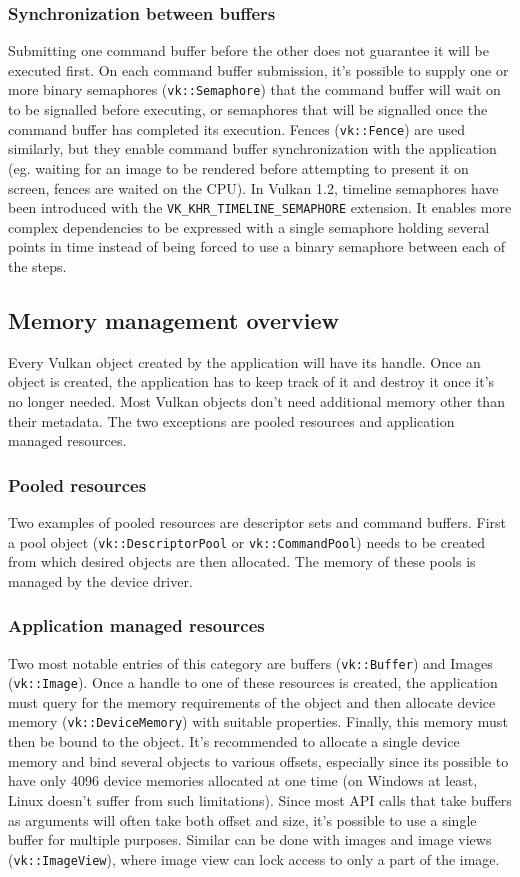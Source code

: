 \documentclass[times, utf8, zavrsni, numeric]{fer}
\begin{document}
\subsubsection{Synchronization between buffers}
Submitting one command buffer before the other does not guarantee it will be executed first. On each command buffer submission, it's possible to supply one or more binary semaphores (\texttt{vk::Semaphore}) that the command buffer will wait on to be signalled before executing, or semaphores that will be signalled once the command buffer has completed its execution. Fences (\texttt{vk::Fence}) are used similarly, but they enable command buffer synchronization with the application (eg. waiting for an image to be rendered before attempting to present it on screen, fences are waited on the CPU). In Vulkan 1.2, timeline semaphores have been introduced with the \texttt{VK\_KHR\_TIMELINE\_SEMAPHORE} extension. It enables more complex dependencies to be expressed with a single semaphore holding several points in time instead of being forced to use a binary semaphore between each of the steps.

\subsection{Memory management overview}
Every Vulkan object created by the application will have its handle. Once an object is created, the application has to keep track of it and destroy it once it's no longer needed. Most Vulkan objects don't need additional memory other than their metadata. The two exceptions are pooled resources and application managed resources.

\subsubsection{Pooled resources}
Two examples of pooled resources are descriptor sets and command buffers. First a pool object (\texttt{vk::DescriptorPool} or \texttt{vk::CommandPool}) needs to be created from which desired objects are then allocated. The memory of these pools is managed by the device driver.

\subsubsection{Application managed resources}
Two most notable entries of this category are buffers (\texttt{vk::Buffer}) and Images (\texttt{vk::Image}). Once a handle to one of these resources is created, the application must query for the memory requirements of the object and then allocate device memory (\texttt{vk::DeviceMemory}) with suitable properties. Finally, this memory must then be bound to the object. It's recommended to allocate a single device memory and bind several objects to various offsets, especially since its possible to have only 4096 device memories allocated at one time (on Windows at least, Linux doesn't suffer from such limitations). Since most API calls that take buffers as arguments will often take both offset and size, it's possible to use a single buffer for multiple purposes. Similar can be done with images and image views (\texttt{vk::ImageView}), where image view can lock access to only a part of the image.
\end{document}
